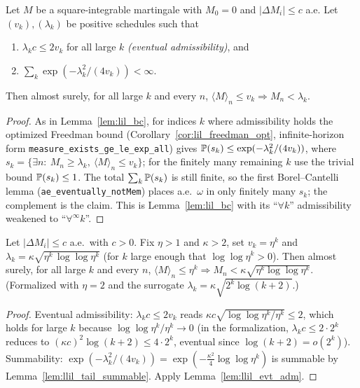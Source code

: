 \begin{lemma}\label{lem:llil_evt_adm}
\leanok
{}
Let $M$ be a square-integrable martingale with $M_0=0$ and $|\Delta M_i|\le c$ a.e.
Let $(v_k),(\lambda_k)$ be positive schedules such that
\begin{enumerate}
  \item $\lambda_k c\le 2v_k$ for all large $k$ \emph{(eventual admissibility)}, and
  \item $\sum_k\exp(-\lambda_k^2/(4v_k))<\infty$.
\end{enumerate}
Then almost surely, for all large $k$ and every $n$,
$\langle M\rangle_n\le v_k\Rightarrow M_n<\lambda_k$.
\end{lemma}
\begin{proof}\leanok
As in Lemma~\ref{lem:lil_bc}, for indices $k$ where admissibility holds the optimized
Freedman bound (Corollary~\ref{cor:lil_freedman_opt}, infinite-horizon form
\texttt{measure\_exists\_ge\_le\_exp\_all}) gives
$\mathbb{P}(s_k)\le\exp(-\lambda_k^2/(4v_k))$, where
$s_k=\{\exists n:\ M_n\ge\lambda_k,\ \langle M\rangle_n\le v_k\}$; for the finitely many
remaining $k$ use the trivial bound $\mathbb{P}(s_k)\le1$. The total $\sum_k\mathbb{P}(s_k)$ is
still finite, so the first Borel--Cantelli lemma (\texttt{ae\_eventually\_notMem})
places a.e.\ $\omega$ in only finitely many $s_k$; the complement is the claim. This is
Lemma~\ref{lem:lil_bc} with its ``$\forall k$'' admissibility weakened to
``$\forall^\infty k$''.
\end{proof}

\begin{lemma}\label{lem:llil_bounded_block}
\leanok
{}
Let $|\Delta M_i|\le c$ a.e.\ with $c>0$. Fix $\eta>1$ and $\kappa>2$, set $v_k=\eta^k$
and $\lambda_k=\kappa\sqrt{\eta^k\,\log\log\eta^k}$ (for $k$ large enough that
$\log\log\eta^k>0$). Then almost surely, for all large $k$ and every $n$,
$\langle M\rangle_n\le\eta^k\Rightarrow M_n<\kappa\sqrt{\eta^k\log\log\eta^k}$.
(Formalized with $\eta=2$ and the surrogate $\lambda_k=\kappa\sqrt{2^k\log(k+2)}$.)
\end{lemma}
\begin{proof}\leanok
Eventual admissibility: $\lambda_k c\le 2v_k$ reads
$\kappa c\sqrt{\log\log\eta^k/\eta^k}\le2$, which holds for large $k$ because
$\log\log\eta^k/\eta^k\to0$ (in the formalization, $\lambda_k c\le2\cdot2^k$ reduces to
$(\kappa c)^2\log(k+2)\le4\cdot2^k$, eventual since $\log(k+2)=o(2^k)$). Summability:
$\exp(-\lambda_k^2/(4v_k))=\exp(-\tfrac{\kappa^2}{4}\log\log\eta^k)$ is summable by
Lemma~\ref{lem:llil_tail_summable}. Apply Lemma~\ref{lem:llil_evt_adm}.
\end{proof}


